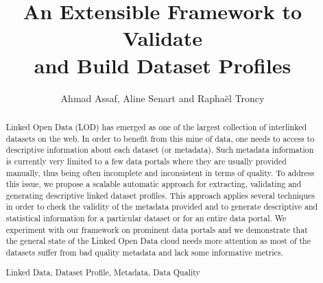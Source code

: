 \documentclass[runningheads,a4paper]{llncs}
\newcommand{\keywords}[1]{\par\addvspace\baselineskip
\noindent\keywordname\enspace\ignorespaces#1}
\begin{document}
\title{An Extensible Framework to Validate\\ and Build Dataset Profiles}

\author{Ahmad Assaf, Aline Senart and Rapha\"{e}l Troncy }



\maketitle


\begin{abstract}
Linked Open Data (LOD) has emerged as one of the largest collection of interlinked datasets on the web. In order to benefit from this mine of data, one needs to access to descriptive information about each dataset (or metadata). Such metadata information is currently very limited to a few data portals where they are usually provided manually, thus being often incomplete and inconsistent in terms of quality. To address this issue, we propose a scalable automatic approach for extracting, validating and generating descriptive linked dataset profiles. This approach applies several techniques in order to check the validity of the metadata provided and to generate descriptive and statistical information for a particular dataset or for an entire data portal. We experiment with our framework on prominent data portals and we demonstrate that the general state of the Linked Open Data cloud needs more attention as most of the datasets suffer from bad quality metadata and lack some informative metrics.
\keywords{Linked Data, Dataset Profile, Metadata, Data Quality}
\end{abstract}

\end{document}
